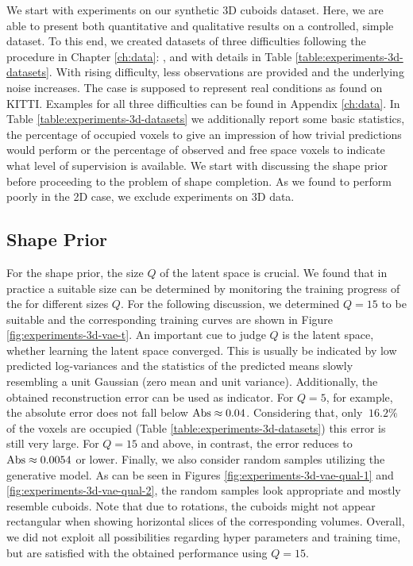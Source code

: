 We start with experiments on our synthetic 3D cuboids dataset.
Here, we are able to present both quantitative and qualitative results
on a controlled, simple dataset. To this end, we created datasets of three difficulties
following the procedure in Chapter \ref{ch:data}:
\easy, \hard and \moderate with details in Table \ref{table:experiments-3d-datasets}.
With rising difficulty, less observations are provided and the underlying noise increases.
The \hard case is supposed to represent real conditions as found on KITTI.
Examples for all three difficulties can be found in Appendix \ref{ch:data}. In
Table \ref{table:experiments-3d-datasets} we additionally report some
basic statistics, \eg the percentage of occupied voxels to give an impression
of how trivial predictions would perform or the percentage of observed
and free space voxels to indicate what level of supervision is available.
We start with discussing the \VAE shape prior before proceeding to the problem
of shape completion. As we found \ML to perform poorly in the 2D case,
we exclude experiments on 3D data.

\subsection{Shape Prior}




For the shape prior, the size $Q$ of the latent space is crucial. We found that in
practice a suitable size can be determined by monitoring the training progress
of the \VAE for different sizes $Q$. For the following discussion, we determined
$Q = 15$ to be suitable and the corresponding training curves are shown
in Figure \ref{fig:experiments-3d-vae-t}.
An important cue to judge $Q$
is the latent space, \ie whether learning the latent space converged. This is
usually be indicated by low predicted log-variances and the statistics of the predicted
means slowly resembling a unit Gaussian (\ie zero mean and unit variance).
Additionally, the obtained reconstruction error can be used as indicator. For $Q = 5$,
for example, the absolute error does not fall below $ \text{Abs} \approx 0.04$.
Considering that, only
$~16.2\%$ of the voxels are occupied (\cf Table \ref{table:experiments-3d-datasets})
this error is still
very large. For $Q = 15$ and above, in contrast, the error reduces to $\text{Abs} \approx 0.0054$ or lower.
Finally, we also consider random samples utilizing the generative model.
As can be seen in Figures \ref{fig:experiments-3d-vae-qual-1}
and \ref{fig:experiments-3d-vae-qual-2}, the random samples
look appropriate and mostly resemble cuboids.
Note that due to rotations, the cuboids might not appear rectangular when
showing horizontal slices of the corresponding volumes.
Overall, we did not exploit all possibilities regarding hyper parameters and
training time, but are satisfied with the obtained performance
using $Q = 15$.

